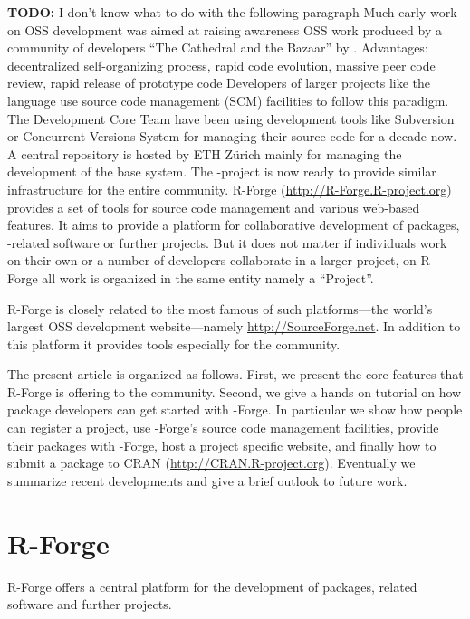 \textbf{TODO: } I don't know what to do with the following paragraph
Much early work on OSS development was aimed at raising awareness  OSS
work produced by a community of developers ``The Cathedral and the
Bazaar'' by \cite{forge:Raymond:1999}.
Advantages:
decentralized self-organizing process, rapid code evolution, massive
peer code review, rapid release of prototype code
Developers of larger projects like the language \R{} use source code
management (SCM) facilities to follow this paradigm.
The \R{} Development Core Team have been using
development tools like Subversion \citep[SVN,
see][]{forge:Pilato+Collins-Sussman+Fitzpatrick:2004} or  
Concurrent Versions System \citep[CVS, see][]{forge:Cederqvist:2006}
for managing their source code for a decade now.  
A central repository is hosted by ETH Z\"urich mainly for
managing the development of the base \R{} system. The
\R{}-project is now ready to provide similar infrastructure
for the entire \R{} community.
R-Forge (\url{http://R-Forge.R-project.org}) provides a set of tools
for source code management and various web-based
features. It aims to provide a platform for collaborative development of
\R{} packages, \R{}-related software or further projects. But it does not
matter if individuals work on their own or a number of developers
collaborate in a larger project, on R-Forge all work is organized in
the same entity namely a ``Project''.

R-Forge is closely related to the most famous of such platforms---the
world's largest OSS development website---namely
\url{http://SourceForge.net}. In addition to this platform it provides
tools especially for the \R{} community.

The present article is organized as follows. First, we present the core
features that R-Forge is offering to the \R{} community. Second, we
give a hands on tutorial on how package developers can get started with 
\R{}-Forge. In particular we show how people can
register a project, use \R{}-Forge's source code management facilities, provide their
packages with \R{}-Forge, host a project specific website, and
finally how to submit a package to CRAN (\url{http://CRAN.R-project.org}).
Eventually we summarize recent developments and give a brief outlook
to future work.

\section{R-Forge}
R-Forge offers a central platform for the development of \R{} packages, \R{}
related software and further projects. 

